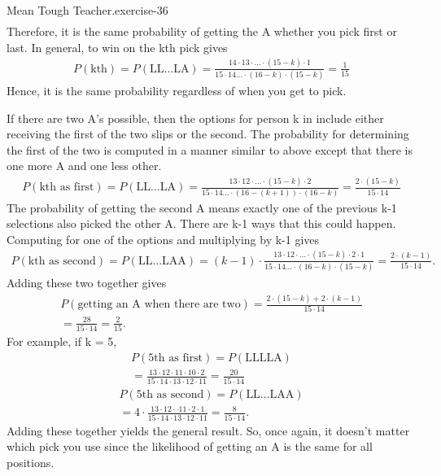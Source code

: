 \documentclass[10pt,]{book}
\numberwithin{equation}{section}
\begin{document}
\begin{inlineexercise}{Mean Tough Teacher.}{exercise-36}
\begin{gather*}
\end{gather*}
Therefore, it is the same probability of getting the A whether you pick first or last.  In general, to win on the kth pick gives%
\begin{gather*}
P(\text{kth}) = P(\text{LL...LA}) = \frac{14 \cdot 13 \cdot ... \cdot (15-k) \cdot 1}{15 \cdot 14 ... \cdot (16-k) \cdot (15-k)} = \frac{1}{15}
\end{gather*}
Hence, it is the same probability regardless of when you get to pick.%
\par
\hypertarget{p-610}{}%
If there are two A's possible, then the options for person k in include either receiving the first of the two slips or the second. The probability for determining the first of the two is computed in a manner similar to above except that there is one more A and one less other.%
\begin{gather*}
P(\text{kth as first}) = P(\text{LL...LA}) = \frac{13 \cdot 12 \cdot ... \cdot (15-k)  \cdot 2}{15 \cdot 14 ... \cdot (16-(k+1)) \cdot (16-k)} = \frac{2 \cdot (15-k)}{15 \cdot 14}
\end{gather*}
The probability of getting the second A means exactly one of the previous k-1 selections also picked the other A. There are k-1 ways that this could happen. Computing for one of the options and multiplying by k-1 gives%
\begin{gather*}
P(\text{kth as second}) = P(\text{LL...LAA}) = (k-1) \cdot \frac{13 \cdot 12 \cdot ... \cdot (15-k) \cdot 2 \cdot 1}{15 \cdot 14 ... \cdot (16-k) \cdot (15-k)} = \frac{2 \cdot (k-1)}{15 \cdot 14}.
\end{gather*}
Adding these two together gives%
\begin{gather*}
P(\text{getting an A when there are two}) = \frac{2 \cdot (15-k) + 2 \cdot (k-1)}{15 \cdot 14}\\
= \frac{28}{15 \cdot 14} = \frac{2}{15}.
\end{gather*}
For example, if k = 5,%
\begin{gather*}
P(\text{5th as first}) = P(\text{LLLLA}) \\
= \frac{13 \cdot 12 \cdot 11 \cdot 10  \cdot 2}{15 \cdot 14 \cdot 13 \cdot 12 \cdot 11} = \frac{20}{15 \cdot 14}
\end{gather*}
%
\begin{gather*}
P(\text{5th as second}) = P(\text{LL...LAA}) \\
= 4 \cdot \frac{13 \cdot 12 \cdot \cdot 11 \cdot 2 \cdot 1}{15 \cdot 14 \cdot 13 \cdot 12 \cdot 11} = \frac{8}{15 \cdot 14}.
\end{gather*}
Adding these together yields the general result. So, once again, it doesn't matter which pick you use since the likelihood of getting an A is the same for all positions.%
\end{inlineexercise}
\end{document}
